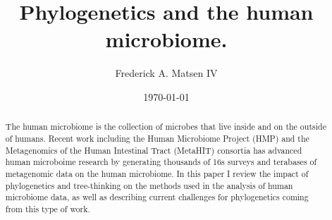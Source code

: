 \documentclass{amsart}
\newcommand{\forarxiv}[1]{#1}
\newcommand{\notforarxiv}[1]{}
\begin{document}
\notforarxiv{
\begin{flushright}
Version dated: \today
\end{flushright}
\bigskip
\noindent RH: PHYLOGENETICS AND THE HUMAN MICROBIOME
\bigskip
\medskip
\begin{center}

\noindent{\Large \bf Phylogenetics and the human microbiome.}
\bigskip

\noindent {\normalsize \sc
Frederick A. Matsen IV$^1$}\\
\noindent {\small \it
$^1$
Program in Computational Biology, Fred Hutchinson Cancer Research Center, Seattle, WA, 91802, USA}\\
\end{center}
\medskip
\noindent{\bf Corresponding author:} Frederick A Matsen, Program in Computational Biology, Fred Hutchinson Cancer Research Center, Seattle, WA, 91802, USA; E-mail: matsen@fhcrc.org.\\
\vspace{1in}
}

\forarxiv{\
\title{Phylogenetics and the human microbiome.}
\author{Frederick A. Matsen IV}
\date{\today}
\begin{abstract}
}
\notforarxiv{
\subsubsection{Abstract}
}

The human microbiome is the collection of microbes that live inside and on the outside of humans.
Recent work including the Human Microbiome Project (HMP) and the Metagenomics of the Human Intestinal Tract (MetaHIT) consortia has advanced human microboime research by generating thousands of 16s surveys and terabases of metagenomic data on the human microbiome.
In this paper I review the impact of phylogenetics and tree-thinking on the methods used in the analysis of human microbiome data, as well as describing current challenges for phylogenetics coming from this type of work.

\forarxiv{
\end{abstract}
\maketitle
}

\notforarxiv{
\noindent (Keywords: human microbiome; microbial ecology; phylogenetic methods; review)\\
\vspace{1.5in}
}
\end{document}
